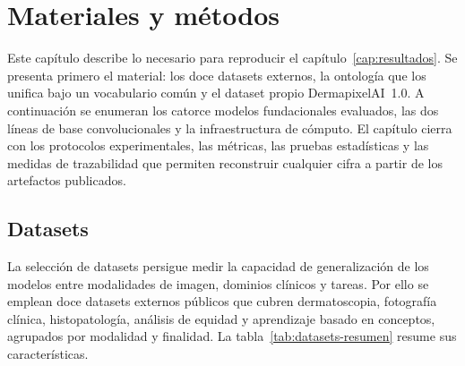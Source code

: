 
\chapter{Materiales y métodos}
\label{cap:metodos}

Este capítulo describe lo necesario para reproducir el
capítulo~\ref{cap:resultados}. Se presenta primero el material: los
doce datasets externos, la ontología que los unifica bajo un
vocabulario común y el dataset propio DermapixelAI~1.0. A
continuación se enumeran los catorce modelos fundacionales
evaluados, las dos líneas de base convolucionales y la
infraestructura de cómputo. El capítulo cierra con los protocolos
experimentales, las métricas, las pruebas estadísticas y las
medidas de trazabilidad que permiten reconstruir cualquier cifra a
partir de los artefactos publicados.

\section{Datasets}
\label{sec:datos}

La selección de datasets persigue medir la capacidad de
generalización de los modelos entre modalidades de imagen, dominios
clínicos y tareas. Por ello se emplean doce datasets externos
públicos que cubren dermatoscopia, fotografía clínica,
histopatología, análisis de equidad y aprendizaje basado en
conceptos, agrupados por modalidad y finalidad. La
tabla~\ref{tab:datasets-resumen} resume sus características.

